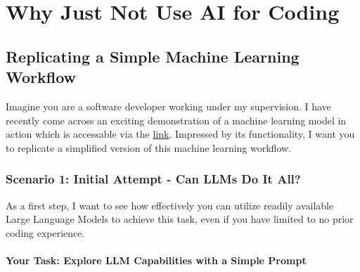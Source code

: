 
\chapter{Why Just Not Use AI for Coding}
\section{Replicating a Simple Machine Learning Workflow}


Imagine you are a software developer working under my supervision. I have recently come across an exciting demonstration of a machine learning model in action which is accessable via the \href{https://your-ml-demo-link-here}{link}.  Impressed by its functionality, I want you to replicate a simplified version of this machine learning workflow.

\subsection{Scenario 1: Initial Attempt - Can LLMs Do It All?}


As a first step, I want to see how effectively you can utilize readily available Large Language Models to achieve this task, even if you have limited to no prior coding experience.
\subsubsection{Your Task: Explore LLM Capabilities with a Simple Prompt}



